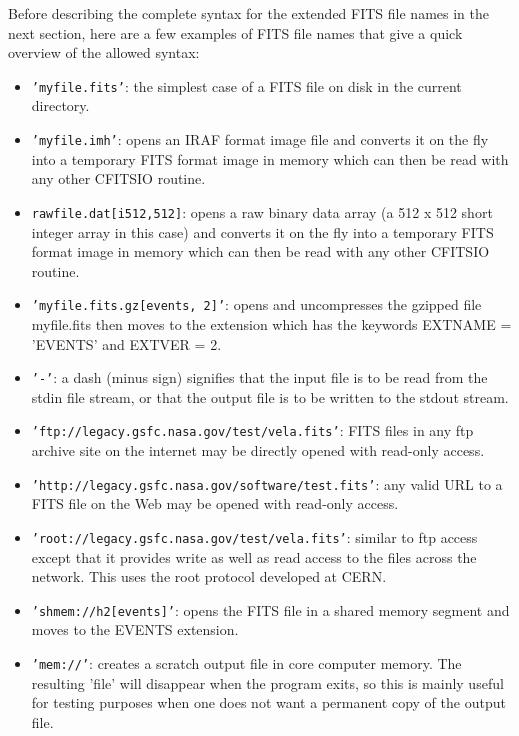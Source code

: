\documentclass[11pt]{book}
\begin{document}
Before describing the complete syntax for the extended FITS file names
in the next section, here are a few examples of FITS file names that
give a quick overview of the allowed syntax:

\begin{itemize}
\item
{\tt 'myfile.fits'}: the simplest case of a FITS file on disk in the current
directory.

\item
{\tt 'myfile.imh'}: opens an IRAF format image file and converts it on the
fly into a temporary FITS format image in memory which can then be read with
any other CFITSIO routine.

\item
{\tt rawfile.dat[i512,512]}: opens a raw binary data array (a 512 x 512
short integer array in this case) and converts it on the fly into a
temporary FITS format image in memory which can then be read with any
other CFITSIO routine.

\item
{\tt 'myfile.fits.gz[events, 2]'}:  opens and uncompresses the gzipped file
myfile.fits then moves to the extension which has the keywords EXTNAME
= 'EVENTS' and EXTVER = 2.

\item
{\tt '-'}:  a dash (minus sign) signifies that the input file is to be read
from the stdin file stream, or that the output file is to be written to
the stdout stream.

\item
{\tt 'ftp://legacy.gsfc.nasa.gov/test/vela.fits'}:  FITS files in any ftp
archive site on the internet may be directly opened with read-only
access.

\item
{\tt 'http://legacy.gsfc.nasa.gov/software/test.fits'}: any valid URL to a
FITS file on the Web may be opened with read-only access.

\item
{\tt 'root://legacy.gsfc.nasa.gov/test/vela.fits'}: similar to ftp access
except that it provides write as well as read access to the files
across the network. This uses the root protocol developed at CERN.

\item
{\tt 'shmem://h2[events]'}: opens the FITS file in a shared memory segment and
moves to the EVENTS extension.

\item
{\tt 'mem://'}:  creates a scratch output file in core computer memory.  The
resulting 'file' will disappear when the program exits, so this
is mainly useful for testing purposes when one does not want a
permanent copy of the output file.


\end{itemize}
\end{document}

